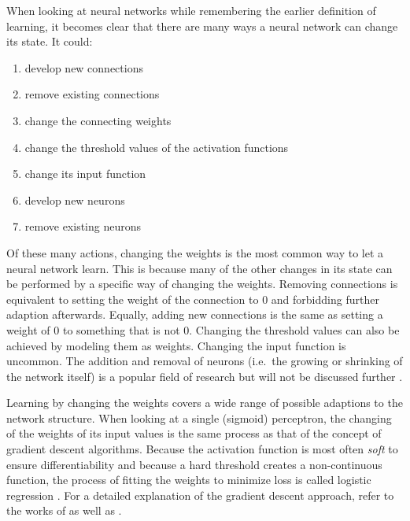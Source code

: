 When looking at neural networks while remembering the earlier definition of learning, it becomes clear that there are many
ways a neural network can change its state. It could:

\begin{enumerate}
    \item develop new connections
    \item remove existing connections
    \item change the connecting weights
    \item change the threshold values of the activation functions
    \item change its input function
    \item develop new neurons
    \item remove existing neurons \cite[p.60]{kriesel2007brief}
\end{enumerate}

Of these many actions, changing the weights is the most common way to let a neural network learn. This is because many
of the other changes in its state can be performed by a specific way of changing the weights. Removing connections is
equivalent to setting the weight of the connection to 0 and forbidding further adaption afterwards. Equally, adding new
connections is the same as setting a weight of 0 to something that is not 0. Changing the threshold values can also be
achieved by modeling them as weights. Changing the input function is uncommon. The addition and removal of neurons
(i.e.\ the growing or shrinking of the network itself) is a popular field of research but will not be discussed further
\cite[p.60]{kriesel2007brief}.

Learning by changing the weights covers a wide range of possible adaptions to the network structure. When
looking at a single (sigmoid) perceptron, the changing of the weights of its input values is the same process as that of the
concept of gradient descent algorithms. Because the activation function is most often \emph{soft} to ensure
differentiability and because a hard threshold creates a non-continuous function, the process of fitting the weights to
minimize loss is called logistic regression \cite[p.729f.]{russell2016artificial}. For a detailed explanation of the gradient
descent approach, refer to the works of \citet{russell2016artificial} as well as
\citet{Goodfellow-et-al-2016}.




